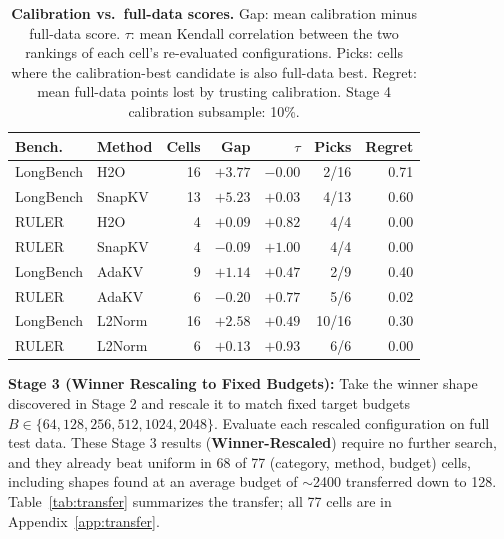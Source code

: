 \documentclass[11pt]{article}
\begin{document}
\begin{table}[htbp]
  \centering
  \footnotesize
  \setlength{\tabcolsep}{2.5pt}
  \begin{tabular}{@{} l l r r r r r @{}}
    \toprule
    \textbf{Bench.} & \textbf{Method} & \textbf{Cells} & \textbf{Gap} & \textbf{$\tau$} & \textbf{Picks} & \textbf{Regret} \\
    \midrule
    \rowcolor{gray!10}
    LongBench & H2O    & 16 & $+3.77$ & $-0.00$ & 2/16 & 0.71 \\
    LongBench & SnapKV & 13 & $+5.23$ & $+0.03$ & 4/13 & 0.60 \\
    \rowcolor{gray!10}
    RULER     & H2O    & 4  & $+0.09$ & $+0.82$ & 4/4  & 0.00 \\
    RULER     & SnapKV & 4  & $-0.09$ & $+1.00$ & 4/4  & 0.00 \\
    \midrule
    \rowcolor{gray!10}
    LongBench & AdaKV & 9 & $+1.14$ & $+0.47$ & 2/9 & 0.40 \\
    RULER     & AdaKV  & 6  & $-0.20$ & $+0.77$ & 5/6  & 0.02 \\
    \midrule
    \rowcolor{gray!10}
    LongBench & L2Norm & 16 & $+2.58$ & $+0.49$ & 10/16 & 0.30 \\
    RULER     & L2Norm & 6  & $+0.13$ & $+0.93$ & 6/6   & 0.00 \\
    \bottomrule
  \end{tabular}
  \caption{\textbf{Calibration vs.\ full-data scores.} Gap: mean calibration minus full-data score. $\tau$: mean Kendall correlation between the two rankings of each cell's re-evaluated configurations. Picks: cells where the calibration-best candidate is also full-data best. Regret: mean full-data points lost by trusting calibration. Stage 4 calibration subsample: 10\%.}
  \label{tab:calib}
\end{table}

\textbf{Stage 3 (Winner Rescaling to Fixed Budgets):} Take the winner shape discovered in Stage 2 and rescale it to match fixed target budgets $B \in \{64, 128, 256, 512, 1024, 2048\}$. Evaluate each rescaled configuration on full test data. These Stage 3 results (\textbf{Winner-Rescaled}) require no further search, and they already beat uniform in 68 of 77 (category, method, budget) cells, including shapes found at an average budget of $\sim$2400 transferred down to 128. Table~\ref{tab:transfer} summarizes the transfer; all 77 cells are in Appendix~\ref{app:transfer}.
\end{document}
